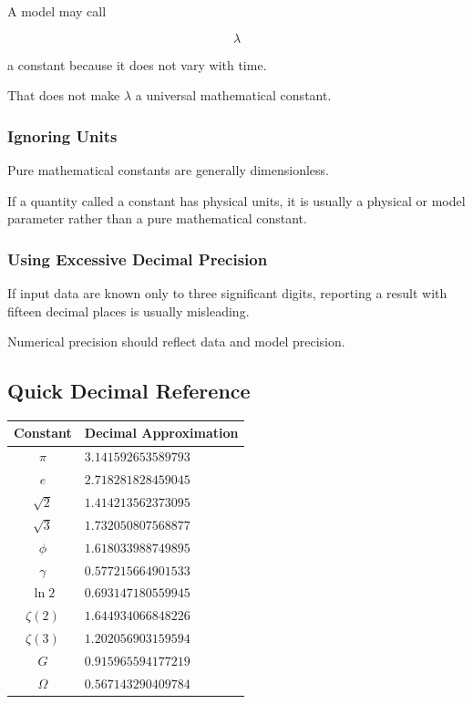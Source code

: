 A model may call

\[
\lambda
\]

a constant because it does not vary with time.

That does not make \(\lambda\) a universal mathematical constant.

\subsubsection{Ignoring Units}

Pure mathematical constants are generally dimensionless.

If a quantity called a constant has physical units, it is usually a physical
or model parameter rather than a pure mathematical constant.

\subsubsection{Using Excessive Decimal Precision}

If input data are known only to three significant digits, reporting a result
with fifteen decimal places is usually misleading.

Numerical precision should reflect data and model precision.

\subsection{Quick Decimal Reference}
\label{subsec:quick-decimal-constants}

\begin{center}
\begin{tabular}{c|l}
\textbf{Constant} & \textbf{Decimal Approximation} \\ \hline
\(\pi\) & \(3.141592653589793\) \\
\(e\) & \(2.718281828459045\) \\
\(\sqrt2\) & \(1.414213562373095\) \\
\(\sqrt3\) & \(1.732050807568877\) \\
\(\phi\) & \(1.618033988749895\) \\
\(\gamma\) & \(0.577215664901533\) \\
\(\ln2\) & \(0.693147180559945\) \\
\(\zeta(2)\) & \(1.644934066848226\) \\
\(\zeta(3)\) & \(1.202056903159594\) \\
\(G\) & \(0.915965594177219\) \\
\(\Omega\) & \(0.567143290409784\)
\end{tabular}
\end{center}

